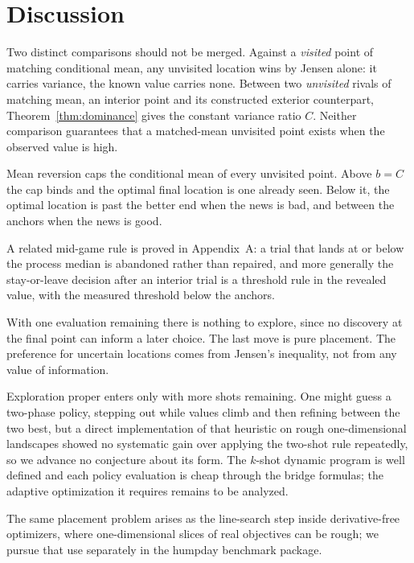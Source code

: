 \documentclass[11pt]{article}
\theoremstyle{itheads}
\begin{document}
\section{Discussion}

Two distinct comparisons should not be merged. Against a \emph{visited} point of
matching conditional mean, any unvisited location wins by Jensen
alone: it carries variance, the known value carries none. Between two
\emph{unvisited} rivals of matching mean, an interior point and its
constructed exterior counterpart, Theorem~\ref{thm:dominance}
gives the constant variance ratio $C$. Neither comparison
guarantees that a matched-mean unvisited point exists when the
observed value is high.

Mean reversion caps the conditional mean of every unvisited point.
Above $b=C$ the cap binds and the optimal final location
is one already seen. Below it, the optimal location is past the
better end when the news is bad, and between the anchors when the
news is good.

A related mid-game rule is proved in Appendix~A: a trial that lands
at or below the process median is abandoned rather than repaired,
and more generally the stay-or-leave decision after an interior
trial is a threshold rule in the revealed value, with the measured
threshold below the anchors.

With one evaluation remaining there is nothing to explore, since no
discovery at the final point can inform a later choice. The last move is pure placement. The preference for uncertain
locations comes from Jensen's inequality, not from any value of
information.

Exploration proper enters only with more shots remaining. One might
guess a two-phase policy, stepping out while values climb and then
refining between the two best, but a direct implementation of that
heuristic on rough one-dimensional landscapes showed no systematic
gain over applying the two-shot rule repeatedly, so we advance no
conjecture about its form. The $k$-shot dynamic program is
well defined and each policy evaluation is cheap through the bridge
formulas; the adaptive optimization it requires remains to be analyzed.

The same placement problem arises as the line-search step inside
derivative-free optimizers, where one-dimensional slices of real objectives can be rough; we pursue that
use separately in the humpday benchmark package.
\end{document}
